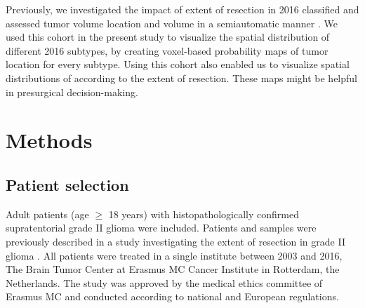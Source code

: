 Previously, we investigated the impact of extent of resection in  2016 classified  and assessed tumor volume location and volume in a semiautomatic manner \autocite{wijnenga2017impact}.
We used this cohort in the present study to visualize the spatial distribution of different  2016  subtypes, by creating voxel-based probability maps of tumor location for every subtype.
Using this cohort also enabled us to visualize spatial distributions of  according to the extent of resection.
These maps might be helpful in presurgical decision-making.

\section{Methods}
\subsection{Patient selection}
Adult patients (age $\geq$ 18 years) with histopathologically confirmed supratentorial grade II glioma were included.
Patients and samples were previously described in a study investigating the extent of resection in grade II glioma \autocite{wijnenga2017impact}.
All patients were treated in a single institute between 2003 and 2016, The Brain Tumor Center at Erasmus MC Cancer Institute in Rotterdam, the Netherlands.
The study was approved by the medical ethics committee of Erasmus MC and conducted according to national and European regulations.

